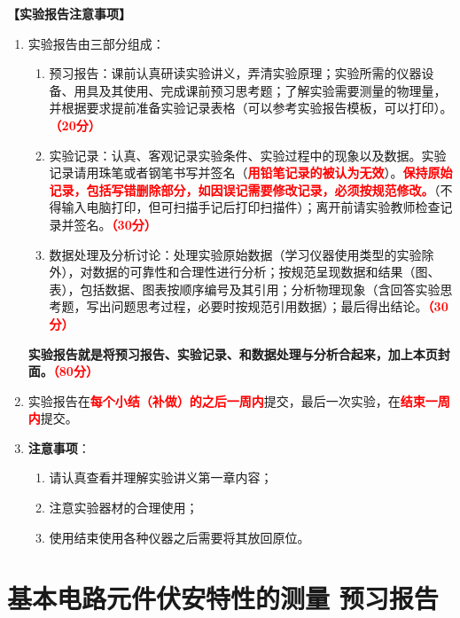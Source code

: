 \documentclass[dvipsnames, svgnames,a4paper,11pt]{article}
\begin{document}
	\textbf{【实验报告注意事项】}
	\begin{enumerate}
		\item 实验报告由三部分组成：
		\begin{enumerate}
			\item 预习报告：课前认真研读实验讲义，弄清实验原理；实验所需的仪器设备、用具及其使用、完成课前预习思考题；了解实验需要测量的物理量，并根据要求提前准备实验记录表格（可以参考实验报告模板，可以打印）。\textcolor{red}{\textbf{（20分）}}
			\item 实验记录：认真、客观记录实验条件、实验过程中的现象以及数据。实验记录请用珠笔或者钢笔书写并签名（\textcolor{red}{\textbf{用铅笔记录的被认为无效}}）。\textcolor{red}{\textbf{保持原始记录，包括写错删除部分，如因误记需要修改记录，必须按规范修改。}}（不得输入电脑打印，但可扫描手记后打印扫描件）；离开前请实验教师检查记录并签名。\textcolor{red}{\textbf{（30分）}}
			\item 数据处理及分析讨论：处理实验原始数据（学习仪器使用类型的实验除外），对数据的可靠性和合理性进行分析；按规范呈现数据和结果（图、表），包括数据、图表按顺序编号及其引用；分析物理现象（含回答实验思考题，写出问题思考过程，必要时按规范引用数据）；最后得出结论。\textcolor{red}{\textbf{（30分）}}
		\end{enumerate}
		\textbf{实验报告就是将预习报告、实验记录、和数据处理与分析合起来，加上本页封面。\textcolor{red}{（80分）}}
		\item 实验报告在\textcolor{red}{\textbf{每个小结（补做）的之后一周内}}提交，最后一次实验，在\textcolor{red}{\textbf{结束一周内}}提交。
		\item \textbf{注意事项}：
		\begin{enumerate}
			\item 请认真查看并理解实验讲义第一章内容；
			\item 注意实验器材的合理使用；
			\item 使用结束使用各种仪器之后需要将其放回原位。
		\end{enumerate}
	\end{enumerate}

	\clearpage
	\tableofcontents
	\clearpage
	
	
	
	
	\setcounter{section}{0}
	\section{基本电路元件伏安特性的测量 \quad\heiti 预习报告}
	
\end{document}
